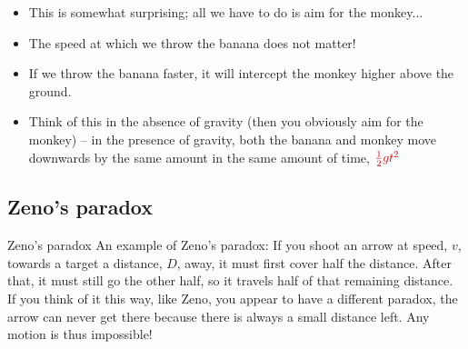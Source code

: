 \documentclass[aspectratio=169,
hyperref={colorlinks,urlcolor=blue}
]{beamer}
\begin{document}
{
\begin{itemize}
\item This is somewhat surprising; all we have to do is aim for the monkey...
\item The speed at which we throw the banana does not matter!
\item If we throw the banana faster, it will intercept the monkey higher above the ground.
\item Think of this in the absence of gravity (then you obviously aim for the monkey) – in the presence of gravity, both the banana and monkey move downwards by the same amount in the same amount of time, $\textcolor{myred}{\frac{1}{2}gt^2}$
\end{itemize}
}
{
}

\subsection{Zeno's paradox}
\label{subsec:zenosparadox}
\begin{frame}{Zeno's paradox}
An example of Zeno's paradox: If you shoot an arrow at speed, $v$, towards a target a distance, $D$, away, it must first cover half the distance. After that, it must still go the other half, so it travels half of that remaining distance. If you think of it this way, like Zeno, you appear to have a different paradox, the arrow can never get there because there is always a small distance left. Any motion is thus impossible!

\end{frame}
\end{document}
